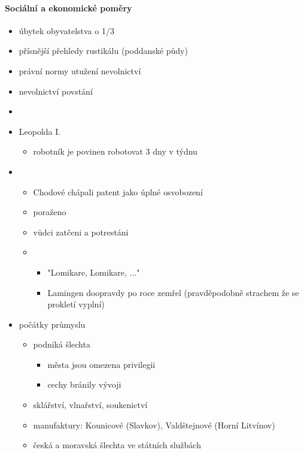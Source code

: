 \paragraph{Sociální a ekonomické poměry}
\begin{itemize}
\item úbytek obyvatelstva o 1/3 
\item přísnější přehledy rustikálu (poddanské půdy)
\item právní normy \ra utužení nevolnictví
\item nevolnictví povstání
\item {}
\item {} Leopolda I.
	\begin{itemize}
	\item robotník je povinen robotovat 3 dny v týdnu
	\end{itemize}
\item {}
	\begin{itemize}
	\item Chodové chápali patent jako úplné osvobození
	\item poraženo
	\item vůdci zatčeni a potrestáni
	\item {}
		\begin{itemize}
		\item "Lomikare, Lomikare, ..."
		\item Lamingen doopravdy po roce zemřel (pravděpodobně strachem že se prokletí vyplní)
		\end{itemize}
	\end{itemize}
\item počátky průmyslu
	\begin{itemize}
	\item podniká šlechta 
		\begin{itemize}
		\item města jsou omezena privilegii
		\item cechy bránily vývoji
		\end{itemize}
	\item sklářství, vlnařství, soukenictví
	\item manufaktury: Kounicové (Slavkov), Valdštejnové (Horní Litvínov)
	\item česká a moravská šlechta ve státních službách 
	\end{itemize}
\end{itemize}

